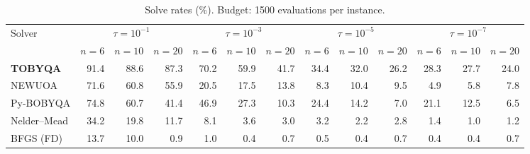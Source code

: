 \begin{table}[t]
\centering\footnotesize
\setlength{\tabcolsep}{3pt}
\caption{Solve rates (\%). Budget: 1500 evaluations per instance.}
\label{tab:solve-rates}
\begin{tabular}{lrrrrrrrrrrrr}
\toprule
Solver & \multicolumn{3}{c}{$\tau=10^{-1}$} & \multicolumn{3}{c}{$\tau=10^{-3}$} & \multicolumn{3}{c}{$\tau=10^{-5}$} & \multicolumn{3}{c}{$\tau=10^{-7}$} \\
\cmidrule(lr){2-4}\cmidrule(lr){5-7}\cmidrule(lr){8-10}\cmidrule(lr){11-13}
 & $n{=}6$ & $n{=}10$ & $n{=}20$ & $n{=}6$ & $n{=}10$ & $n{=}20$ & $n{=}6$ & $n{=}10$ & $n{=}20$ & $n{=}6$ & $n{=}10$ & $n{=}20$ \\
\midrule
\textbf{TOBYQA} & 91.4 & 88.6 & 87.3 & 70.2 & 59.9 & 41.7 & 34.4 & 32.0 & 26.2 & 28.3 & 27.7 & 24.0 \\
NEWUOA & 71.6 & 60.8 & 55.9 & 20.5 & 17.5 & 13.8 & 8.3 & 10.4 & 9.5 & 4.9 & 5.8 & 7.8 \\
Py-BOBYQA & 74.8 & 60.7 & 41.4 & 46.9 & 27.3 & 10.3 & 24.4 & 14.2 & 7.0 & 21.1 & 12.5 & 6.5 \\
Nelder--Mead & 34.2 & 19.8 & 11.7 & 8.1 & 3.6 & 3.0 & 3.2 & 2.2 & 2.8 & 1.4 & 1.0 & 1.2 \\
BFGS (FD) & 13.7 & 10.0 & 0.9 & 1.0 & 0.4 & 0.7 & 0.5 & 0.4 & 0.7 & 0.4 & 0.4 & 0.7 \\
\bottomrule
\end{tabular}
\end{table}
